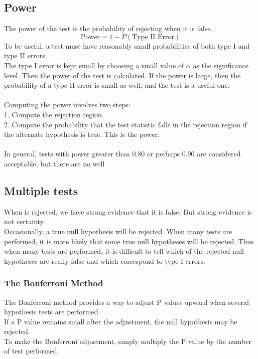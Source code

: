 \documentclass[../main.tex]{subfiles}
\begin{document}
\subsection{Power}
The power of the test is the probability of rejecting \hn when it is false.
$$\mbox{Power} = 1-P(\mbox{Type II Error})$$
To be useful, a test must have reasonably small probabilities of both type I and type II errors.\\
The type I error is kept small by choosing a small value of $\alpha$ as the significance level. Then the power of the test is calculated. If the power is large, then the probability of a type II error is small as well, and the test is a useful one.\\
\\
Computing the power involves two steps:\\
1. Compute the rejection region.\\
2. Compute the probability that the test statistic falls in the rejection region if the alternate hypothesis is true. This is the power.\\
\\
In general, tests with power greater than 0.80 or perhaps 0.90 are considered acceptable, but there are no well

\subsection{Multiple tests}
When \hn is rejected, we have strong evidence that it is false. But strong evidence is not certainty.\\
Occasionally, a true null hypothesis will be rejected. When many tests are performed, it is more likely that some true null hypotheses will be rejected. Thus when many tests are performed, it is difficult to tell which of the rejected null hypotheses are really false and which correspond to type I errors.

\subsubsection*{The Bonferroni Method}
The Bonferroni method provides a way to adjust P values upward when several hypothesis tests are performed.\\
If a P value remains small after the adjustment, the null hypothesis may be rejected.\\
To make the Bonferroni adjustment, simply multiply the P value by the number of test performed.
\newpage
\end{document}
